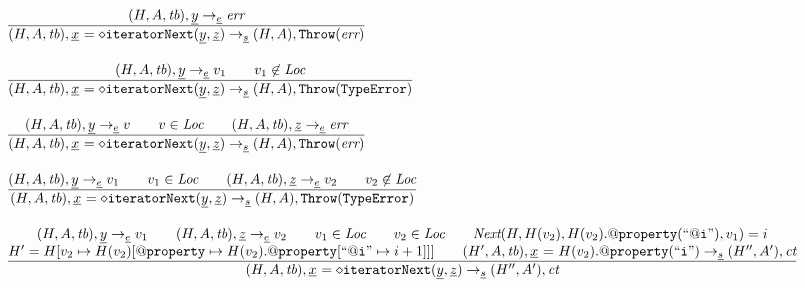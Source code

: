 \[\begin{array}{l@{~~}l@{~~}ll}
\frac{\begin{matrix}
\evale, \ir{y} \rightarrow_{\ir\expr} \err
\end{matrix}}{\begin{matrix}
\state, \irid \ {\tt = {\diamond}iteratorNext}(\ir{y}, \ir{z})  \rightarrow_{\ir\stmt} \res, \error
\end{matrix}}
\\[2em]

\frac{\begin{matrix}
\evale, \ir{y} \rightarrow_{\ir\expr} v_1
\rulesep
v_1\not\in\Loc
\end{matrix}}{\begin{matrix}
\state, \irid \ {\tt = {\diamond}iteratorNext}(\ir{y}, \ir{z})  \rightarrow_{\ir\stmt} \res, \thte
\end{matrix}}
\\[2em]

\frac{\begin{matrix}
\evale, \ir{y} \rightarrow_{\ir\expr} v
\rulesep
v\in\Loc
\rulesep
\evale, \ir{z} \rightarrow_{\ir\expr} \err
\end{matrix}}{\begin{matrix}
\state, \irid \ {\tt = {\diamond}iteratorNext}(\ir{y}, \ir{z})  \rightarrow_{\ir\stmt} \res, \error
\end{matrix}}
\\[2em]

\frac{\begin{matrix}
\evale, \ir{y} \rightarrow_{\ir\expr} v_1
\rulesep
v_1\in\Loc
\rulesep
\evale, \ir{z} \rightarrow_{\ir\expr} v_2
\rulesep
v_2\not\in\Loc
\end{matrix}}{\begin{matrix}
\state, \irid \ {\tt = {\diamond}iteratorNext}(\ir{y}, \ir{z})  \rightarrow_{\ir\stmt} \res, \thte
\end{matrix}}
\\[2em]

\frac{\begin{matrix}
\evale, \ir{y} \rightarrow_{\ir\expr} v_1
\rulesep
\evale, \ir{z} \rightarrow_{\ir\expr} v_2
\rulesep
v_1\in\Loc
\rulesep
v_2\in\Loc
\rulesep
\hf{Next}(H, H(v_2), H(v_2).{\tt@property}({\tt``@i"}),v_1) = i%
\\
H' = H[v_2 \mapsto H(v_2)[{\tt@property}\mapsto H(v_2).{\tt@property}[{\tt``@i"}\mapsto i+1]]]%
\rulesep
(H',A,\tb), \irid \ {\tt =} \ H(v_2).{\tt@property}({\tt``i"}) \rightarrow_{\ir\stmt} (H'',A'), \ct
\end{matrix}}{\begin{matrix}
\state, \irid \ {\tt = {\diamond}iteratorNext}(\ir{y}, \ir{z})  \rightarrow_{\ir\stmt} (H'',A'), \ct
\end{matrix}}
\\[4em]



\end{array}\]

